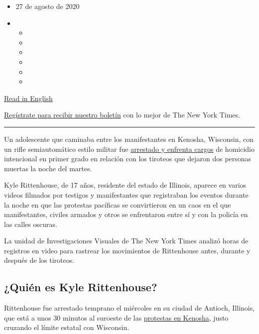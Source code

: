 \begin{itemize}
\item
  27 de agosto de 2020
\item
  \begin{itemize}
  \item
  \item
  \item
  \item
  \item
  \item
  \end{itemize}
\end{itemize}

\href{https://www.nytimes3xbfgragh.onion/2020/08/27/us/kyle-rittenhouse-kenosha-shooting-video.html}{Read
in English}

\href{https://www.nytimes3xbfgragh.onion/newsletters/el-times}{Regístrate
para recibir nuestro boletín} con lo mejor de The New York Times.

\begin{center}\rule{0.5\linewidth}{\linethickness}\end{center}

Un adolescente que caminaba entre los manifestantes en Kenosha,
Wisconsin, con un rifle semiautomático estilo militar fue
\href{https://www.nytimes3xbfgragh.onion/2020/08/26/us/kenosha-shooting-protests-jacob-blake.html?action=click\&module=Top\%20Stories\&pgtype=Homepage}{arrestado
y enfrenta cargos} de homicidio intencional en primer grado en relación
con los tiroteos que dejaron dos personas muertas la noche del martes.

Kyle Rittenhouse, de 17 años, residente del estado de Illinois, aparece
en varios videos filmados por testigos y manifestantes que registraban
los eventos durante la noche en que las protestas pacíficas se
convirtieron en un caos en el que manifestantes, civiles armados y otros
se enfrentaron entre sí y con la policía en las calles oscuras.

La unidad de Investigaciones Visuales de The New York Times analizó
horas de registros en video para rastrear los movimientos de Rittenhouse
antes, durante y después de los tiroteos.

\hypertarget{quiuxe9n-es-kyle-rittenhouse}{%
\subsection{¿Quién es Kyle
Rittenhouse?}\label{quiuxe9n-es-kyle-rittenhouse}}

Rittenhouse fue arrestado temprano el miércoles en su ciudad de Antioch,
Illinois, que está a unos 30 minutos al suroeste de las
\href{https://www.nytimes3xbfgragh.onion/2020/08/27/us/kenosha-shooting-protests.html}{protestas
en Kenosha}, justo cruzando el límite estatal con Wisconsin.

